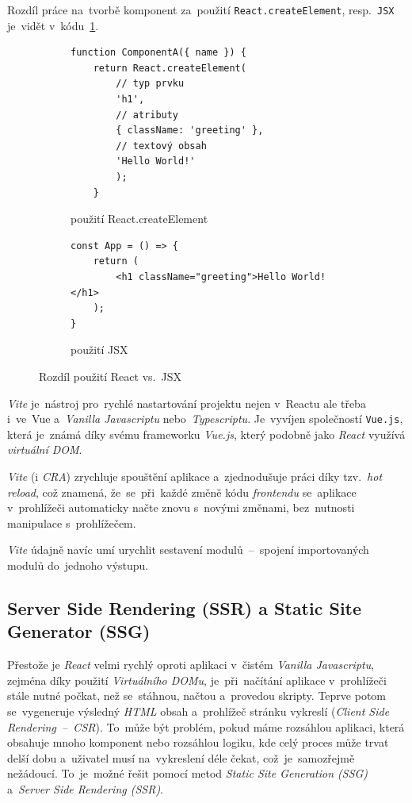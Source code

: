 \documentclass[10pt,a4paper]{article}
\begin{document}
        Rozdíl práce na~tvorbě komponent za~použití \texttt{React.createElement}, resp.~\texttt{JSX} je~vidět v~kódu~\ref{JSXcomponent}.
        \begin{figure}
            \begin{subfigure}[b]{0.45\linewidth}
                \begin{verbatim}
function ComponentA({ name }) {
    return React.createElement(
        // typ prvku
        'h1',
        // atributy
        { className: 'greeting' },
        // textový obsah
        'Hello World!'
        );
    }
                \end{verbatim}
            \caption{použití React.createElement}
            \end{subfigure}
            \hfill
            \begin{subfigure}[b]{0.45\linewidth}
                \begin{verbatim}
const App = () => {
    return (
        <h1 className="greeting">Hello World!</h1>
    );
}
                \end{verbatim}
                \vspace{1cm}
                \caption{použití JSX}
            \end{subfigure}
            \caption{Rozdíl použití React vs.~JSX}
            \label{JSXcomponent}
        \end{figure}

\emph{Vite} je~nástroj pro~rychlé nastartování projektu nejen v~Reactu ale třeba i~ve~Vue a~\emph{Vanilla Javascriptu} nebo~\emph{Typescriptu}. Je~vyvíjen společností \texttt{Vue.js}, která je~známá díky svému frameworku \emph{Vue.js}, který podobně jako \emph{React} využívá \emph{virtuální DOM}.

\emph{Vite} (i \emph{CRA}) zrychluje spouštění aplikace a~zjednodušuje práci díky tzv.~\emph{hot reload}, což znamená, že~se~při~každé změně kódu \emph{frontendu} se~aplikace v~prohlížeči automaticky načte znovu s~novými změnami, bez~nutnosti manipulace s~prohlížečem.

\emph{Vite} údajně navíc umí urychlit sestavení modulů~--~spojení importovaných modulů do~jednoho výstupu.\cite{vitejs}

\subsection{Server Side Rendering (SSR) a Static Site Generator (SSG)}
Přestože je \emph{React} velmi rychlý oproti aplikaci v~čistém \emph{Vanilla Javascriptu}, zejména díky použití \emph{Virtuálního DOMu}, je~při~načítání aplikace v~prohlížeči stále nutné počkat, než se~stáhnou, načtou a~provedou skripty. Teprve potom se~vygeneruje výsledný \emph{HTML} obsah a~prohlížeč stránku vykreslí (\emph{Client Side Rendering~--~CSR})\cite{mediumWhatCSR}. To~může být problém, pokud máme rozsáhlou aplikaci, která obsahuje mnoho komponent nebo rozsáhlou logiku, kde celý proces může trvat delší dobu a~uživatel musí na~vykreslení déle čekat, což~je~samozřejmě nežádoucí. To~je~možné řešit pomocí metod \emph{Static Site Generation (SSG)} a~\emph{Server Side Rendering (SSR)}.
\end{document}
